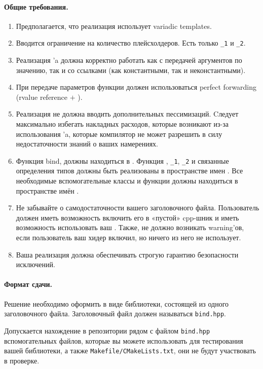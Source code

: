 \documentclass[a4paper,10pt]{article}
\begin{document}
\paragraph{Общие требования.}
\begin{enumerate}
    \item Предполагается, что реализация использует variadic templates.
    \item Вводится     ограничение на количество плейсхолдеров. Есть только
        \verb!_1! и \verb!_2!.
    \item Реализация ’a должна корректно работать как с передачей
        аргументов по значению, так и со ссылками (как константными, так и 
        неконстантными). 
    \item При передаче параметров функции должен использоваться perfect
        forwarding (rvalue reference $+$ ).
    \item Реализация не должна вводить дополнительных пессимизаций. 
        Cледует максимально избегать накладных расходов, которые
        возникают из-за использования ’a, которые компилятор не
        может  разрешить в силу недостаточности знаний о ваших намерениях.
    \item Функция bind,  должны находиться в .
        Функция , \verb!_1!, \verb!_2! и связанные определения типов должны быть реализованы в пространстве имен .
        Все необходимые вспомогательные классы и функции должны находиться в пространстве имён .
    \item Не забывайте о самодостаточности вашего заголовочного файла. Пользователь
        должен иметь возможность включить его в «пустой» cpp-шник и иметь возможность
        использовать ваш . Также, не должно возникать warning’ов, если
        пользователь ваш хидер включил, но ничего из него не использует.
    \item Ваша реализация должна обеспечивать строгую гарантию безопасности
        исключений.
\end{enumerate}

\paragraph{Формат сдачи.}
Решение необходимо оформить в виде библиотеки, состоящей из одного заголовочного файла.
Заголовочный файл должен называться {\tt bind.hpp}.

Допускается нахождение в репозитории рядом с файлом {\tt bind.hpp} вспомогательных
файлов, которые вы можете использовать для тестирования вашей библиотеки, а
также {\tt Makefile/CMakeLists.txt}, они не будут участвовать в проверке.
\end{document}

